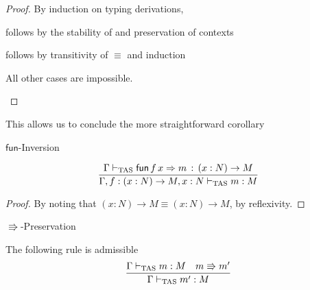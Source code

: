 \begin{proof}
By induction on typing derivations,
 
\begin{casenv}
 \item {} follows by the stability of  and preservation of contexts
 \item {} follows by transitivity of $\equiv$ and induction
 \item All other cases are impossible.
\end{casenv}
 
\end{proof}
This allows us to conclude the more straightforward corollary
\begin{cor}
$\mathsf{fun}$-Inversion
 
\[
\frac{\Gamma\vdash_{\mathrm{TAS}}\mathsf{fun}\,f\,x\Rightarrow m\,:\,\left(x:N\right)\rightarrow M}{\Gamma,f:\left(x:N\right)\rightarrow M,x:N\vdash_{\mathrm{TAS}} m:M}
\]
\end{cor}
 
\begin{proof}
By noting that $\left(x:N\right)\rightarrow M\equiv\left(x:N\right)\rightarrow M$, by reflexivity.
\end{proof}
\begin{thm}
$\Rrightarrow$-Preservation
 
The following rule is admissible
\[
\frac{\Gamma\vdash_{\mathrm{TAS}} m:M\quad m\Rrightarrow m'}{\Gamma\vdash_{\mathrm{TAS}} m':M}
\]
\end{thm}
 
